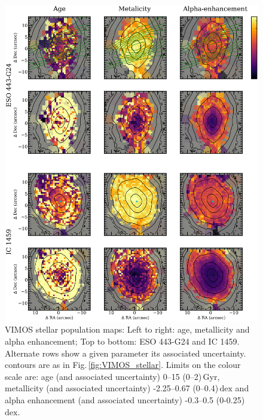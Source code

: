 		\begin{figure}
			\centering
			\includegraphics[height=0.63\textheight]{chapter4/vimos/pop1.png}
			\caption[VIMOS stellar population maps]{VIMOS stellar population maps: Left to right: age, metallicity and alpha enhancement; Top to bottom: ESO 443-G24 and IC 1459. Alternate rows show a given parameter its associated uncertainty. contours are as in Fig.\,\ref{fig:VIMOS_stellar}. Limits on the colour scale are: age (and associated uncertainty) 0--15 (0--2)\,Gyr, metallicity (and associated uncertainty) -2.25--0.67 (0--0.4)\,$\mathrm{dex}$ and alpha enhancement (and associated uncertainty) -0.3--0.5 (0-0.25)\,$\mathrm{dex}$.}
			\label{fig:VIMOS_pop}
		\end{figure}
